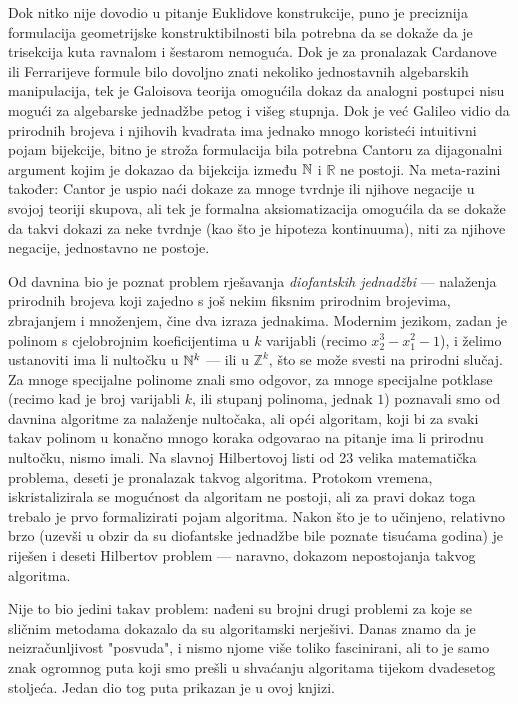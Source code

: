Dok nitko nije dovodio u pitanje Euklidove konstrukcije, puno je preciznija formulacija geometrijske konstruktibilnosti bila potrebna da se dokaže da je trisekcija kuta ravnalom i šestarom nemoguća. Dok je za pronalazak Cardanove ili Ferrarijeve formule bilo dovoljno znati nekoliko jednostavnih algebarskih manipulacija, tek je Galoisova teorija omogućila dokaz da analogni postupci nisu mogući za algebarske jednadžbe petog i višeg stupnja. Dok je već Galileo vidio da prirodnih brojeva i njihovih kvadrata ima jednako mnogo koristeći intuitivni pojam bijekcije, bitno je stroža formulacija bila potrebna Cantoru za dijagonalni argument kojim je dokazao da bijekcija između ${\mathbb N}$ i $\mathbb R$ ne postoji. Na meta-razini također: Cantor je uspio naći dokaze za mnoge tvrdnje ili njihove negacije u svojoj teoriji skupova, ali tek je formalna aksiomatizacija omogućila da se dokaže da takvi dokazi za neke tvrdnje (kao što je hipoteza kontinuuma), niti za njihove negacije, jednostavno ne postoje.

Od davnina bio je poznat problem rješavanja \emph{diofantskih jednadžbi} --- nalaženja prirodnih brojeva koji zajedno s još nekim fiksnim prirodnim brojevima, zbrajanjem i množenjem, čine dva izraza jednakima. Modernim jezikom, zadan je polinom s cjelobrojnim koeficijentima u $k$ varijabli (recimo $x_2^3-x_1^2-1$), i želimo ustanoviti ima li nultočku u ${\mathbb N}^k$ --- ili u $\mathbb Z^k$, što se može svesti na prirodni slučaj. Za mnoge specijalne polinome znali smo odgovor, za mnoge specijalne potklase (recimo kad je broj varijabli $k$, ili stupanj polinoma, jednak $1$) poznavali smo od davnina algoritme za nalaženje nultočaka, ali opći algoritam, koji bi za svaki takav polinom u konačno mnogo koraka odgovarao na pitanje ima li prirodnu nultočku, nismo imali. Na slavnoj Hilbertovoj listi od 23 velika matematička problema, deseti je pronalazak takvog algoritma. Protokom vremena, iskristalizirala se mogućnost da algoritam ne postoji, ali za pravi dokaz toga trebalo je prvo formalizirati pojam algoritma. Nakon što je to učinjeno, relativno brzo (uzevši u obzir da su diofantske jednadžbe bile poznate tisućama godina) je riješen i deseti Hilbertov problem --- naravno, dokazom nepostojanja takvog algoritma.


Nije to bio jedini takav problem: nađeni su brojni drugi problemi za koje se sličnim metodama dokazalo da su algoritamski nerješivi. Danas znamo da je neizračunljivost "posvuda", i nismo njome više toliko fascinirani, ali to je samo znak ogromnog puta koji smo prešli u shvaćanju algoritama tijekom dvadesetog stoljeća. Jedan dio tog puta prikazan je u ovoj knjizi.

